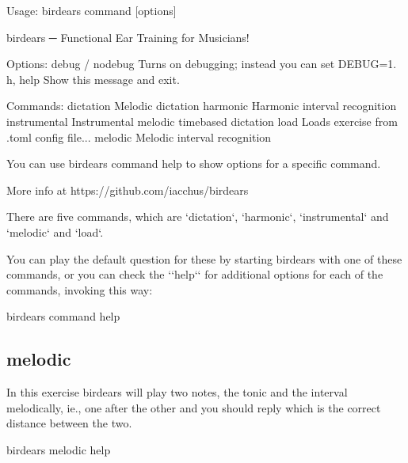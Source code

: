 \documentclass[letterpaper,10pt,english]{sphinxmanual}
\begin{document}
\begin{sphinxVerbatim}[commandchars=\\\{\}]
Usage: birdears  \PYGZlt{}command\PYGZgt{} [options]

  birdears ─ Functional Ear Training for Musicians!

Options:
  \PYGZhy{}\PYGZhy{}debug / \PYGZhy{}\PYGZhy{}no\PYGZhy{}debug  Turns on debugging; instead you can set DEBUG=1.
  \PYGZhy{}h, \PYGZhy{}\PYGZhy{}help            Show this message and exit.

Commands:
  dictation     Melodic dictation
  harmonic      Harmonic interval recognition
  instrumental  Instrumental melodic time\PYGZhy{}based dictation
  load          Loads exercise from .toml config file...
  melodic       Melodic interval recognition

  You can use \PYGZsq{}birdears \PYGZlt{}command\PYGZgt{} \PYGZhy{}\PYGZhy{}help\PYGZsq{} to show options for a specific
  command.

  More info at https://github.com/iacchus/birdears


There are five commands, which are {}`dictation{}`, {}`harmonic{}`, {}`instrumental{}` and
{}`melodic{}` and {}`load{}`.

You can play the default question for these by starting birdears with one of
these commands, or you can check the {}`{}`\PYGZhy{}\PYGZhy{}help{}`{}` for additional options for each
of the commands, invoking this way:
\end{sphinxVerbatim}

\begin{sphinxVerbatim}[commandchars=\\\{\}]
birdears \PYGZlt{}command\PYGZgt{} \PYGZhy{}\PYGZhy{}help
\end{sphinxVerbatim}


\subsection{melodic}
\label{\detokenize{using:melodic}}
In this exercise birdears will play two notes, the tonic and the interval
melodically, ie., one after the other and you should reply which is the
correct distance between the two.

\begin{sphinxVerbatim}[commandchars=\\\{\}]
birdears melodic \PYGZhy{}\PYGZhy{}help
\end{sphinxVerbatim}
\end{document}
